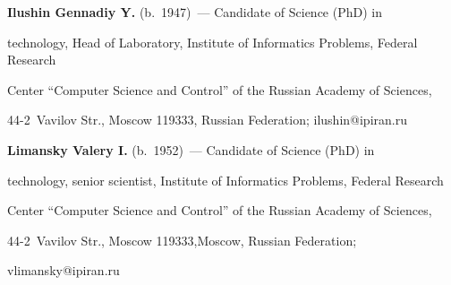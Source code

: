 \Contr





\noindent


\textbf{Ilushin Gennadiy Y.} (b.\ 1947)~--- Candidate of Science (PhD) in 


technology, Head of Laboratory, Institute of Informatics Problems, Federal Research 


Center ``Computer Science and Control'' of the Russian Academy of Sciences,  


44-2~Vavilov Str., Moscow 119333, Russian Federation; \mbox{ilushin@ipiran.ru}





\vspace*{3pt}





\noindent


\textbf{Limansky Valery I.} (b.\ 1952)~--- Candidate of Science (PhD) in 


technology, senior scientist, Institute of Informatics Problems, Federal Research 


Center ``Computer Science and Control'' of the Russian Academy of Sciences,  


44-2~Vavilov Str., Moscow 119333,Moscow, Russian Federation; 


\mbox{vlimansky@ipiran.ru}








\label{end\stat}








\renewcommand{\bibname}{\protect\rm Литература}


